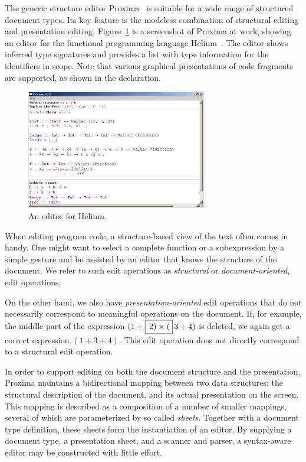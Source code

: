 \documentclass{article}[10pt]
\begin{document}
The generic structure editor Proxima~\cite{schrage04Proxima} is suitable for a wide range of structured document types. Its key feature is the modeless combination of structural editing and presentation editing. Figure~\ref{fig:heliumEditor} is a screenshot of Proxima at work, showing an editor for the functional programming language Helium~\cite{heeren03helium}. The editor shows inferred type signatures and provides a list with type information for the identifiers in scope. Note that various graphical presentations of code fragments are supported, as shown in the declaration.


\begin{figure}[ht]
\centering
\includegraphics[width=0.7\textwidth]{images/HeliumEditor}
\caption{An editor for Helium.}
\label{fig:heliumEditor}
\end{figure}


When editing program code, a structure-based view of the text often comes in handy. One might want to select a complete  function or a subexpression by a simple gesture and be assisted by an editor that knows the structure of the document. We refer to such edit operations as {\em structural} or {\em document-oriented}, edit operations.

On the other hand, we also have {\em presentation-oriented} edit operations that do not necessarily correspond to meaningful operations on the document. If, for example, the middle part of the expression $(1+\framebox{$\,2) \times ($}\,3+4)$ is deleted, we again get a correct expression $(1+3+4)$. This edit operation does not directly correspond to a structural edit operation.


In order to support editing on both the document structure and the presentation, Proxima maintains a bidirectional mapping between two data structures: the structural description of the document, and its actual presentation on the screen. This mapping is described as a composition of a number of smaller mappings, several of which are parameterized by so called {\em sheets}. Together with a document type definition, these sheets form the instantiation of an editor. By supplying a document type, a presentation sheet, and a scanner and parser, a syntax-aware editor may be constructed with little effort.
\end{document}
